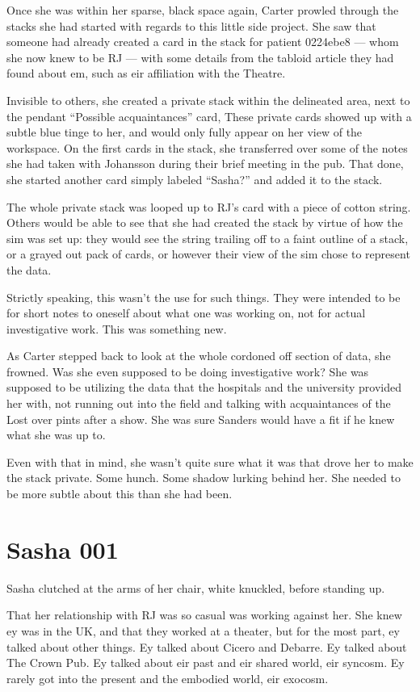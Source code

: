 Once she was within her sparse, black space again, Carter prowled through the stacks she had started with regards to this little side project. She saw that someone had already created a card in the stack for patient 0224ebe8 --- whom she now knew to be RJ --- with some details from the tabloid article they had found about em, such as eir affiliation with the Theatre.

Invisible to others, she created a private stack within the delineated area, next to the pendant ``Possible acquaintances'' card, These private cards showed up with a subtle blue tinge to her, and would only fully appear on her view of the workspace. On the first cards in the stack, she transferred over some of the notes she had taken with Johansson during their brief meeting in the pub. That done, she started another card simply labeled ``Sasha?'' and added it to the stack.

The whole private stack was looped up to RJ's card with a piece of cotton string. Others would be able to see that she had created the stack by virtue of how the sim was set up: they would see the string trailing off to a faint outline of a stack, or a grayed out pack of cards, or however their view of the sim chose to represent the data.

Strictly speaking, this wasn't the use for such things. They were intended to be for short notes to oneself about what one was working on, not for actual investigative work. This was something new.

As Carter stepped back to look at the whole cordoned off section of data, she frowned. Was she even supposed to be doing investigative work? She was supposed to be utilizing the data that the hospitals and the university provided her with, not running out into the field and talking with acquaintances of the Lost over pints after a show. She was sure Sanders would have a fit if he knew what she was up to.

Even with that in mind, she wasn't quite sure what it was that drove her to make the stack private. Some hunch. Some shadow lurking behind her. She needed to be more subtle about this than she had been.

\chapter*{Sasha 001}

Sasha clutched at the arms of her chair, white knuckled, before standing up.

That her relationship with RJ was so casual was working against her. She knew ey was in the UK, and that they worked at a theater, but for the most part, ey talked about other things. Ey talked about Cicero and Debarre. Ey talked about The Crown Pub. Ey talked about eir past and eir shared world, eir syncosm. Ey rarely got into the present and the embodied world, eir exocosm.


